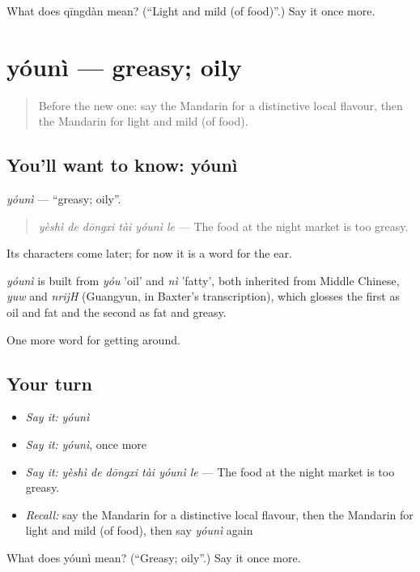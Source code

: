 \begin{tcolorbox}[breakable,colback=teal!4,colframe=teal!35!black,title={Before you move on}]
What does qīngdàn mean? (\textquotedblleft{}Light and mild (of food)\textquotedblright{}.) Say it once more.
\end{tcolorbox}
\section[yóunì]{yóunì — greasy; oily}

\label{lesson:ZH-C449-youni}



\begin{quote}
Before the new one: say the Mandarin for a distinctive local flavour, then the Mandarin for light and mild (of food).
\end{quote}

\subsection*{You'll want to know: yóunì}
\emph{yóunì} — \textquotedblleft{}greasy; oily\textquotedblright{}.

\begin{quote}
\emph{yèshì de dōngxi tài yóunì le} — The food at the night market is too greasy.
\end{quote}

Its characters come later; for now it is a word for the ear.

\begin{cousinweb}
\emph{yóunì} is built from \emph{yóu} 'oil' and \emph{nì} 'fatty', both inherited from Middle Chinese, \emph{yuw} and \emph{nrijH} (Guangyun, in Baxter's transcription), which glosses the first as oil and fat and the second as fat and greasy.
\end{cousinweb}

\begin{grammarlens}[title={What you've built}]
One more word for getting around.
\end{grammarlens}

\subsection*{Your turn}
\begin{itemize}
\raggedright
  \item \emph{Say it:} \emph{yóunì}
  \item \emph{Say it:} \emph{yóunì}, once more
  \item \emph{Say it:} \emph{yèshì de dōngxi tài yóunì le} — The food at the night market is too greasy.
  \item \emph{Recall:} say the Mandarin for a distinctive local flavour, then the Mandarin for light and mild (of food), then say \emph{yóunì} again
\end{itemize}

\begin{tcolorbox}[breakable,colback=teal!4,colframe=teal!35!black,title={Before you move on}]
What does yóunì mean? (\textquotedblleft{}Greasy; oily\textquotedblright{}.) Say it once more.
\end{tcolorbox}
